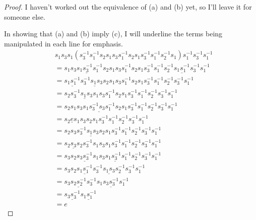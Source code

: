 \documentclass[11pt]{amsart}
\theoremstyle{definition}
\begin{document}
\begin{proof}
I haven't worked out the equivalence of (a) and (b) yet, so I'll leave it for someone else.

In showing that (a) and (b) imply (c), I will underline the terms being manipulated in each line for emphasis.
\begin{align*}
& s_{1}s_{3}s_{1}(s_{3}^{-1}s_{1}^{-1}s_{2}s_{1}s_{3}s_{1}^{-1}s_{2}s_{1}s_{3}^{-1}s_{1}^{-1}s_{2}^{-1}s_{1})s_{1}^{-1}s_{3}^{-1}s_{1}^{-1} \\
&= s_{1}\underline{s_{3}s_{1}s_{3}^{-1}s_{1}^{-1}}s_{2}s_{1}s_{3}s_{1}^{-1}s_{2}s_{1}s_{3}^{-1}s_{1}^{-1}s_{2}^{-1}\underline{s_{1}s_{1}^{-1}}s_{3}^{-1}s_{1}^{-1} \\
&= \underline{s_{1}s_{1}^{-1}}\underline{s_{3}^{-1}s_{1}s_{3}s_{2}}s_{1}s_{3}s_{1}^{-1}s_{2}s_{1}s_{3}^{-1}s_{1}^{-1}s_{2}^{-1}s_{3}^{-1}s_{1}^{-1} \\
&= s_{2}\underline{s_{3}^{-1}s_{1}s_{3}s_{1}}s_{3}s_{1}^{-1}s_{2}s_{1}s_{3}^{-1}s_{1}^{-1}s_{2}^{-1}s_{3}^{-1}s_{1}^{-1} \\
&= s_{2}s_{1}s_{3}\underline{s_{1}s_{3}^{-1}s_{3}s_{1}^{-1}}s_{2}s_{1}s_{3}^{-1}s_{1}^{-1}s_{2}^{-1}s_{3}^{-1}s_{1}^{-1} \\
&= s_{2}\underline{e}s_{1}s_{3}s_{2}s_{1}s_{3}^{-1}s_{1}^{-1}s_{2}^{-1}s_{3}^{-1}s_{1}^{-1} \\
&= s_{2}s_{3}\underline{s_{3}^{-1}s_{1}s_{3}s_{2}}s_{1}s_{3}^{-1}s_{1}^{-1}s_{2}^{-1}s_{3}^{-1}s_{1}^{-1} \\
&= \underline{s_{2}s_{3}s_{2}}s_{3}^{-1}s_{1}s_{3}s_{1}s_{3}^{-1}s_{1}^{-1}s_{2}^{-1}s_{3}^{-1}s_{1}^{-1} \\
&= s_{3}s_{2}\underline{s_{3}s_{3}^{-1}}s_{1}\underline{s_{3}s_{1}s_{3}^{-1}s_{1}^{-1}}s_{2}^{-1}s_{3}^{-1}s_{1}^{-1} \\
&= s_{3}s_{2}\underline{s_{1}s_{1}^{-1}}\underline{s_{3}^{-1}s_{1}s_{3}s_{2}^{-1}}s_{3}^{-1}s_{1}^{-1} \\
&= s_{3}\underline{s_{2}s_{2}^{-1}}s_{3}^{-1}s_{1}\underline{s_{3}s_{3}^{-1}}s_{1}^{-1} \\
&= \underline{s_{3}s_{3}^{-1}}\underline{s_{1}s_{1}^{-1}} \\
&= e
\end{align*}
\end{proof}
\end{document}
